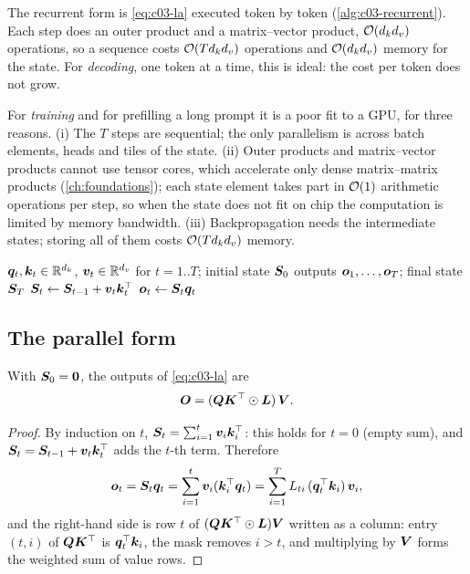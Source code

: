 The recurrent form is \cref{eq:c03-la} executed token by token (\cref{alg:c03-recurrent}). Each
step does an outer product and a matrix--vector product, $\mathcal{O}(d_kd_v)$ operations, so a
sequence costs $\mathcal{O}(Td_kd_v)$ operations and $\mathcal{O}(d_kd_v)$ memory for the state. For
\emph{decoding}, one token at a time, this is ideal: the cost per token does not grow.

For \emph{training} and for prefilling a long prompt it is a poor fit to a GPU, for three
reasons. (i) The $T$ steps are sequential; the only parallelism is across batch elements, heads
and tiles of the state. (ii) Outer products and matrix--vector products cannot use tensor cores,
which accelerate only dense matrix--matrix products (\cref{ch:foundations}); each state element
takes part in $\mathcal{O}(1)$ arithmetic operations per step, so when the state does not fit on chip
the computation is limited by memory bandwidth. (iii) Backpropagation needs the intermediate
states; storing all of them costs $\mathcal{O}(Td_kd_v)$ memory.

\begin{algorithm}[t]
\caption{Linear attention, recurrent form (decoding, or reference prefill)}\label{alg:c03-recurrent}
\begin{algorithmic}[1]
\Require $\bm{q}_t,\bm{k}_t\in\mathbb{R}^{d_k}$, $\bm{v}_t\in\mathbb{R}^{d_v}$ for $t=1..T$; initial state $\bm{S}_0$
\Ensure outputs $\bm{o}_1,\dots,\bm{o}_T$; final state $\bm{S}_T$
  \State $\bm{S}_t\gets\bm{S}_{t-1}+\bm{v}_t\bm{k}_t^{\top}$ 
  \State $\bm{o}_t\gets\bm{S}_t\bm{q}_t$ 
\EndFor
\end{algorithmic}
\end{algorithm}

\subsection{The parallel form}

\begin{proposition}\label{prop:c03-parallel}
With $\bm{S}_0=\bm 0$, the outputs of \cref{eq:c03-la} are
\begin{equation}\label{eq:c03-parallel}
  \bm{O}=(\bm{Q}\bm{K}^{\top}\odot\bm{L})\,\bm{V} .
\end{equation}
\end{proposition}

\begin{proof}
By induction on $t$, $\bm{S}_t=\sum_{i=1}^{t}\bm{v}_i\bm{k}_i^{\top}$: this holds for $t=0$ (empty sum), and
$\bm{S}_t=\bm{S}_{t-1}+\bm{v}_t\bm{k}_t^{\top}$ adds the $t$-th term. Therefore
\[
  \bm{o}_t=\bm{S}_t\bm{q}_t=\sum_{i=1}^{t}\bm{v}_i(\bm{k}_i^{\top}\bm{q}_t)
  =\sum_{i=1}^{T}L_{ti}\,(\bm{q}_t^{\top}\bm{k}_i)\,\bm{v}_i ,
\]
and the right-hand side is row $t$ of $(\bm{Q}\bm{K}^{\top}\odot\bm{L})\bm{V}$ written as a column: entry
$(t,i)$ of $\bm{Q}\bm{K}^{\top}$ is $\bm{q}_t^{\top}\bm{k}_i$, the mask removes $i>t$, and multiplying by $\bm{V}$ forms
the weighted sum of value rows.
\end{proof}

